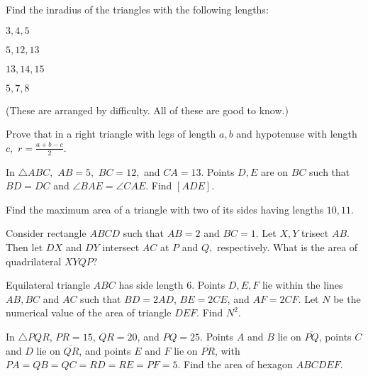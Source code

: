 \documentclass{article}
\begin{document}


\begin{prob}[]{1}
Find the inradius of the triangles with the following lengths:
    
    \begin{itemize}
        \Item $3,4,5$
        
        \Item $5,12,13$
        
        \Item $13,14,15$
        
        \Item $5,7,8$
    \end{itemize}

    (These are arranged by difficulty. All of these are good to know.)
\end{prob}
    
\begin{prob}[]{2}
Prove that in a right triangle with legs of length $a,b$ and hypotenuse with length $c,$ $r=\frac{a+b-c}{2}.$
\end{prob}

\begin{prob}[]{2}
In $\triangle ABC,$ $AB=5,$ $BC=12,$ and $CA=13.$ Points $D,E$ are on $BC$ such that $BD=DC$ and $\angle BAE=\angle CAE.$ Find $[ADE].$
\end{prob}

\begin{req}[]{2}
Find the maximum area of a triangle with two of its sides having lengths $10,11.$
\end{req}

\begin{prob}{2}
Consider rectangle $ABCD$ such that $AB=2$ and $BC=1.$ Let $X,Y$ trisect $AB.$ Then let $DX$ and $DY$ intersect $AC$ at $P$ and $Q,$ respectively. What is the area of quadrilateral $XYQP?$
\end{prob}

\begin{req}{2}
Equilateral triangle $ABC$ has side length $6$. Points $D, E, F$ lie within the lines $AB, BC$ and $AC$ such that $BD=2AD$, $BE=2CE$, and $AF=2CF$. Let $N$ be the numerical value of the area of triangle $DEF$. Find $N^2$.
\end{req}

\begin{prob}[AIME I 2019/3]{2}
In $\triangle PQR$, $PR=15$, $QR=20$, and $PQ=25$. Points $A$ and $B$ lie on $\overline{PQ}$, points $C$ and $D$ lie on $\overline{QR}$, and points $E$ and $F$ lie on $\overline{PR}$, with $PA=QB=QC=RD=RE=PF=5$. Find the area of hexagon $ABCDEF$.
\end{prob}
\end{document}
